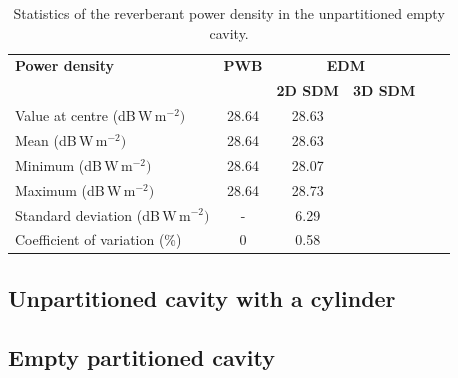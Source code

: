 \documentclass[a4paper]{article}
\numberwithin{equation}{section}
\begin{document}
\begin{table}[ht]
\begin{center}
\begin{tabular}{|l|c|c|c|c|c|}
\hline
\textbf{Power density}               &\textbf{PWB} &\multicolumn{2}{|c|}{\textbf{EDM}} \\ \cline{3-4}
{}                                   &{}           &\textbf{2D SDM} &\textbf{3D SDM}  \\
\hline
Value at centre (dB\,W\,m$^{-2})$    &28.64        &28.63           &{} \\
Mean (dB\,W\,m$^{-2})$               &28.64        &28.63           &{} \\
Minimum (dB\,W\,m$^{-2})$            &28.64        &28.07           &{} \\
Maximum (dB\,W\,m$^{-2})$            &28.64        &28.73           &{} \\
Standard deviation (dB\,W\,m$^{-2})$ &-            &6.29            &{} \\
Coefficient of variation (\%)        &0            &0.58            &{} \\
\hline
\end{tabular}
\end{center}
\caption{\label{tb:emptyunpart} Statistics of the reverberant power density in the unpartitioned empty cavity.}
\end{table}

\subsection[Unpartitioned cavity with a cylinder]{Unpartitioned cavity with a cylinder}
\label{sc:tcs:cylunpart}

\subsection[Empty partitioned cavity]{Empty partitioned cavity}
\label{sc:tcs:emptypart}
\end{document}
